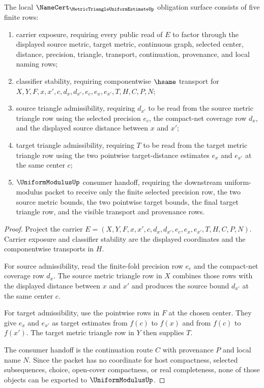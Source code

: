 \begin{theorem}
\label{thm:metric-triangle-uniform-estimate-namecert-obligations}
The local $\NameCert_{\MetricTriangleUniformEstimateUp}$ obligation surface consists of five finite rows:
\begin{enumerate}
\item carrier exposure, requiring every public read of $E$ to factor through the displayed source metric, target metric, continuous graph, selected center, distance, precision, triangle, transport, continuation, provenance, and local naming rows;
\item classifier stability, requiring componentwise $\hsame$ transport for $X,Y,F,x,x',c,d_x,d_{x'},e_c,e_x,e_{x'},T,H,C,P,N$;
\item source triangle admissibility, requiring $d_{x'}$ to be read from the source metric triangle row using the selected precision $e_c$, the compact-net coverage row $d_x$, and the displayed source distance between $x$ and $x'$;
\item target triangle admissibility, requiring $T$ to be read from the target metric triangle row using the two pointwise target-distance estimates $e_x$ and $e_{x'}$ at the same center $c$;
\item $\UniformModulusUp$ consumer handoff, requiring the downstream uniform-modulus packet to receive only the finite selected precision row, the two source metric bounds, the two pointwise target bounds, the final target triangle row, and the visible transport and provenance rows.
\end{enumerate}
\end{theorem}
\begin{proof}
Project the carrier $E=(X,Y,F,x,x',c,d_x,d_{x'},e_c,e_x,e_{x'},T,H,C,P,N)$. Carrier exposure and classifier stability are the displayed coordinates and the componentwise transports in $H$.

For source admissibility, read the finite-fold precision row $e_c$ and the compact-net coverage row $d_x$. The source metric triangle row in $X$ combines those rows with the displayed distance between $x$ and $x'$ and produces the source bound $d_{x'}$ at the same center $c$.

For target admissibility, use the pointwise rows in $F$ at the chosen center. They give $e_x$ and $e_{x'}$ as target estimates from $f(c)$ to $f(x)$ and from $f(c)$ to $f(x')$. The target metric triangle row in $Y$ then supplies $T$.

The consumer handoff is the continuation route $C$ with provenance $P$ and local name $N$. Since the packet has no coordinate for host compactness, selected subsequences, choice, open-cover compactness, or real completeness, none of those objects can be exported to $\UniformModulusUp$.
\end{proof}

